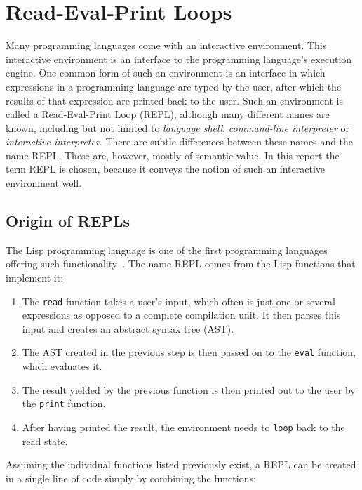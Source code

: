 \section{Read-Eval-Print Loops}
\label{sec:repl}

Many programming languages come with an interactive environment. This
interactive environment is an interface to the programming language's execution
engine. One common form of such an environment is an interface in which
expressions in a programming language are typed by the user, after which the
results of that expression are printed back to the user. Such an environment is
called a Read-Eval-Print Loop (REPL), although many different names are known,
including but not limited to \textit{language shell},
\textit{command-line interpreter} or \textit{interactive interpreter}. There
are subtle differences between these names and the name REPL. These are,
however, mostly of semantic value. In this report the term REPL is chosen,
because it conveys the notion of such an interactive environment well.

\subsection{Origin of REPLs}
\label{repl-origin}

The Lisp programming language is one of the first programming
languages offering such functionality~\cite{Noyes92}. The name REPL comes from
the Lisp functions that implement it:

\begin{enumerate}
  \item The \texttt{read} function takes a user's input, which often is just one
    or several expressions as opposed to a complete compilation unit. It then
    parses this input and creates an abstract syntax tree (AST).
  \item The AST created in the previous step is then passed on to the
    \texttt{eval} function, which evaluates it.
  \item The result yielded by the previous function is then printed out to the
    user by the \texttt{print} function.
  \item After having printed the result, the environment needs to \texttt{loop}
    back to the read state.
\end{enumerate}

Assuming the individual functions listed previously exist, a REPL can be created
in a single line of code simply by combining the functions:

